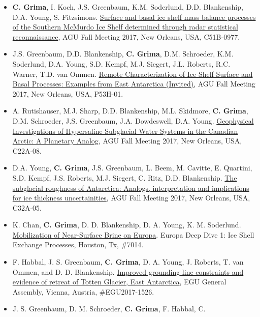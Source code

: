 \begin{itemize}
\item
  \textbf{C. Grima}, I. Koch, J.S. Greenbaum, K.M. Soderlund, D.D.
  Blankenship, D.A. Young, S. Fitzsimons.
  \href{https://agu.confex.com/agu/fm17/meetingapp.cgi/Paper/235143}{Surface
  and basal ice shelf mass balance processes of the Southern McMurdo Ice
  Shelf determined through radar statistical reconnaissance}, AGU Fall
  Meeting 2017, New Orleans, USA, C51B-0977.
\item
  J.S. Greenbaum, D.D. Blankenship, \textbf{C. Grima}, D.M. Schroeder,
  K.M. Soderlund, D.A. Young, S.D. Kempf, M.J. Siegert, J.L. Roberts,
  R.C. Warner, T.D. van Ommen.
  \href{https://agu.confex.com/agu/fm17/meetingapp.cgi/Paper/262299}{Remote
  Characterization of Ice Shelf Surface and Basal Processes: Examples
  from East Antarctica (Invited)}, AGU Fall Meeting 2017, New Orleans,
  USA, P53H-01.
\item
  A. Rutishauser, M.J. Sharp, D.D. Blankenship, M.L. Skidmore,
  \textbf{C. Grima}, D.M. Schroeder, J.S. Greenbaum, J.A. Dowdeswell,
  D.A. Young.
  \href{https://agu.confex.com/agu/fm17/meetingapp.cgi/Paper/278269}{Geophysical
  Investigations of Hypersaline Subglacial Water Systems in the Canadian
  Arctic: A Planetary Analog}, AGU Fall Meeting 2017, New Orleans, USA,
  C22A-08.
\item
  D.A. Young, \textbf{C. Grima}, J.S. Greenbaum, L. Beem, M. Cavitte, E.
  Quartini, S.D. Kempf, J.S. Roberts, M.J. Siegert, C. Ritz, D.D.
  Blankenship.
  \href{https://agu.confex.com/agu/fm17/meetingapp.cgi/Paper/292771}{The
  subglacial roughness of Antarctica: Analogs, interpretation and
  implications for ice thickness uncertainities}, AGU Fall Meeting 2017,
  New Orleans, USA, C32A-05.
\item
  K. Chan, \textbf{C. Grima}, D. D. Blankenship, D. A. Young, K. M.
  Soderlund.
  \href{http://www.hou.usra.edu/meetings/europadeepdive2017/pdf/sess201.pdf}{Mobilization
  of Near-Surface Brine on Europa}. Europa Deep Dive 1: Ice Shell
  Exchange Processes, Houston, Tx, \#7014.
\item
  F. Habbal, J. S. Greenbaum, \textbf{C. Grima}, D. A. Young, J.
  Roberts, T. van Ommen, and D. D. Blankenship.
  \href{http://meetingorganizer.copernicus.org/EGU2017/EGU2017-1526.pdf}{Improved
  grounding line constraints and evidence of retreat of Totten Glacier,
  East Antarctica}, EGU General Assembly, Vienna, Austria,
  \#EGU2017-1526.
\item
  J. S. Greenbaum, D. M. Schroeder, \textbf{C. Grima}, F. Habbal, C.

\end{itemize}

